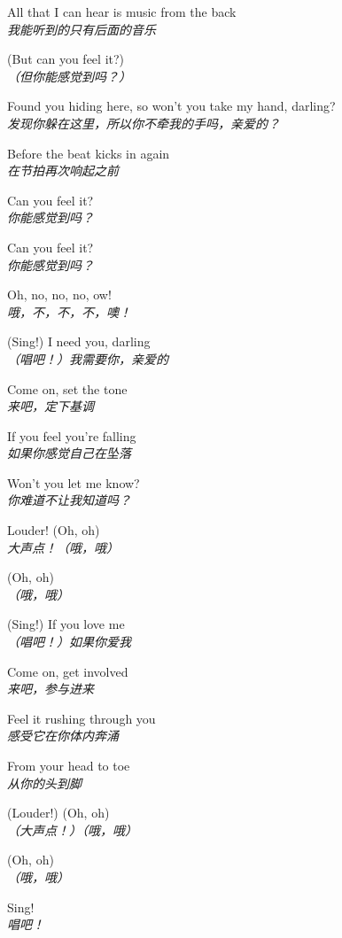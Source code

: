 \begin{spacing}{1.5}
\begin{flushleft}
All that I can hear is music from the back\\
\textit{我能听到的只有后面的音乐}\lyricspace

(But can you feel it?)\\
\textit{（但你能感觉到吗？）}\lyricspace

Found you hiding here, so won't you take my hand, darling?\\
\textit{发现你躲在这里，所以你不牵我的手吗，亲爱的？}\lyricspace

Before the beat kicks in again\\
\textit{在节拍再次响起之前}\lyricspace

Can you feel it?\\
\textit{你能感觉到吗？}\lyricspace

Can you feel it?\\
\textit{你能感觉到吗？}\lyricspace

Oh, no, no, no, ow!\\
\textit{哦，不，不，不，噢！}\lyricspace

(Sing!) I need you, darling\\
\textit{（唱吧！）我需要你，亲爱的}\lyricspace

Come on, set the tone\\
\textit{来吧，定下基调}\lyricspace

If you feel you're falling\\
\textit{如果你感觉自己在坠落}\lyricspace

Won't you let me know?\\
\textit{你难道不让我知道吗？}\lyricspace

Louder! (Oh, oh)\\
\textit{大声点！（哦，哦）}\lyricspace

(Oh, oh)\\
\textit{（哦，哦）}\lyricspace

(Sing!) If you love me\\
\textit{（唱吧！）如果你爱我}\lyricspace

Come on, get involved\\
\textit{来吧，参与进来}\lyricspace

Feel it rushing through you\\
\textit{感受它在你体内奔涌}\lyricspace

From your head to toe\\
\textit{从你的头到脚}\lyricspace

(Louder!) (Oh, oh)\\
\textit{（大声点！）（哦，哦）}\lyricspace

(Oh, oh)\\
\textit{（哦，哦）}\lyricspace

Sing!\\
\textit{唱吧！}\lyricspace
\end{flushleft}
\end{spacing} 
